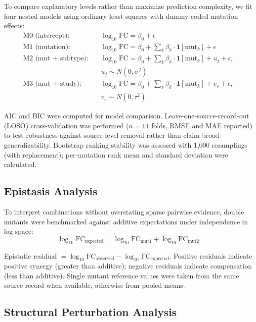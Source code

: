 \documentclass[preprint,authoryear]{elsarticle}
\begin{document}
To compare explanatory levels rather than maximize prediction complexity, we fit four nested models using ordinary least squares with dummy-coded mutation effects:
\begin{align}
\text{M0 (intercept):} &\quad \log_{10}\text{FC} = \beta_0 + \epsilon \\
\text{M1 (mutation):} &\quad \log_{10}\text{FC} = \beta_0 + \sum_k \beta_k \cdot \mathbf{1}[\text{mut}_k] + \epsilon \\
\text{M2 (mut + subtype):} &\quad \log_{10}\text{FC} = \beta_0 + \sum_k \beta_k \cdot \mathbf{1}[\text{mut}_k] + u_j + \epsilon, \\
&\quad u_j \sim N(0, \sigma^2) \\
\text{M3 (mut + study):} &\quad \log_{10}\text{FC} = \beta_0 + \sum_k \beta_k \cdot \mathbf{1}[\text{mut}_k] + v_s + \epsilon, \\
&\quad v_s \sim N(0, \tau^2)
\end{align}

AIC and BIC were computed for model comparison. Leave-one-source-record-out (LOSO) cross-validation was performed ($n=11$ folds, RMSE and MAE reported) to test robustness against source-level removal rather than claim broad generalizability. Bootstrap ranking stability was assessed with 1,000 resamplings (with replacement); per-mutation rank mean and standard deviation were calculated.

\subsection{Epistasis Analysis}

To interpret combinations without overstating sparse pairwise evidence, double mutants were benchmarked against additive expectations under independence in log space:
\begin{equation}
\log_{10}\text{FC}_{\text{expected}} = \log_{10}\text{FC}_{\text{mut1}} + \log_{10}\text{FC}_{\text{mut2}}
\end{equation}

Epistatic residual $= \log_{10}\text{FC}_{\text{observed}} - \log_{10}\text{FC}_{\text{expected}}$. Positive residuals indicate positive synergy (greater than additive); negative residuals indicate compensation (less than additive). Single mutant reference values were taken from the same source record when available, otherwise from pooled means.

\subsection{Structural Perturbation Analysis}
\end{document}
